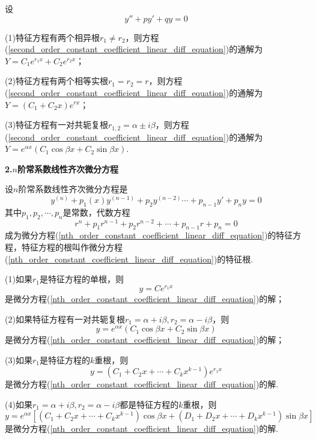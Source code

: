 设
\begin{equation}
    y''+py'+qy=0 \label{second_order_constant_coefficient_linear_diff_equation}
\end{equation}

(1)特征方程有两个相异根$r_1\neq r_2$，则方程(\ref{second_order_constant_coefficient_linear_diff_equation})的通解为$Y=C_1e^{r_1x}+C_2e^{r_2x}$；

(2)特征方程有两个相等实根$r_1=r_2=r$，则方程(\ref{second_order_constant_coefficient_linear_diff_equation})的通解为$Y=(C_1+C_2x)e^{rx}$；

(3)特征方程有一对共轭复根$r_{1,2}=\alpha\pm i\beta$，则方程(\ref{second_order_constant_coefficient_linear_diff_equation})的通解为$Y=e^{\alpha x}(C_1\cos\beta x+C_2\sin\beta x)$.

\textbf{2.$n$阶常系数线性齐次微分方程}

设$n$阶常系数线性齐次微分方程是
\begin{equation}
    y^{(n)}+p_1(x)y^{(n-1)}+p_2y^{(n-2)}\cdots+p_{n-1}y'+p_ny=0
    \label{nth_order_constant_coefficient_linear_diff_equation}
\end{equation}
其中$p_1,p_2,\cdots,p_n$是常数，代数方程
\begin{equation*}
    r^n+p_1r^{n-1}+p_2r^{n-2}+\cdots+p_{n-1}r+p_n=0
\end{equation*}
成为微分方程(\ref{nth_order_constant_coefficient_linear_diff_equation})的特征方程，特征方程的根叫作微分方程(\ref{nth_order_constant_coefficient_linear_diff_equation})的特征根.

(1)如果$r_1$是特征方程的单根，则
\begin{equation*}
    y=Ce^{r_1x}
\end{equation*}
是微分方程(\ref{nth_order_constant_coefficient_linear_diff_equation})的解；

(2)如果特征方程有一对共轭复根$r_1=\alpha+i\beta,r_2=\alpha-i\beta$，则
\begin{equation*}
    y=e^{\alpha x}(C_1\cos\beta x+C_2\sin\beta x)
\end{equation*}
是微分方程(\ref{nth_order_constant_coefficient_linear_diff_equation})的解；

(3)如果$r_1$是特征方程的$k$重根，则
\begin{equation*}
    y=(C_1+C_2x+\cdots+C_kx^{k-1})e^{r_1x}
\end{equation*}
是微分方程(\ref{nth_order_constant_coefficient_linear_diff_equation})的解.

(4)如果$r_1=\alpha+i\beta,r_2=\alpha-i\beta$都是特征方程的$k$重根，则
\begin{equation*}
    y=e^{\alpha x}[(C_1+C_2x+\cdots+C_kx^{k-1})\cos\beta x+(D_1+D_2x+\cdots+D_kx^{k-1})\sin\beta x]
\end{equation*}
是微分方程(\ref{nth_order_constant_coefficient_linear_diff_equation})的解.

